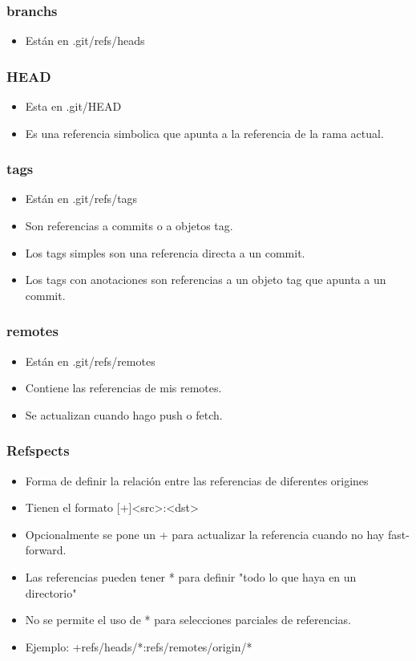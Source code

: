 \documentclass[10pt]{beamer}
\begin{document}
  \begin{frame}
    \frametitle{branchs}
    \begin{itemize}
        \item Están en .git/refs/heads
    \end{itemize}
  \end{frame}

  \begin{frame}
    \frametitle{HEAD}
    \begin{itemize}
        \item Esta en .git/HEAD
        \item Es una referencia simbolica que apunta a la referencia de la rama actual.
    \end{itemize}
  \end{frame}

  \begin{frame}
    \frametitle{tags}
    \begin{itemize}
        \item Están en .git/refs/tags
        \item Son referencias a commits o a objetos tag.
        \item Los tags simples son una referencia directa a un commit.
        \item Los tags con anotaciones son referencias a un objeto tag que apunta a un commit.
    \end{itemize}
  \end{frame}

  \begin{frame}
    \frametitle{remotes}
    \begin{itemize}
        \item Están en .git/refs/remotes
        \item Contiene las referencias de mis remotes.
        \item Se actualizan cuando hago push o fetch.
    \end{itemize}
  \end{frame}

  \begin{frame}
    \frametitle{Refspects}
    \begin{itemize}
        \item Forma de definir la relación entre las referencias de diferentes origines
        \item Tienen el formato [+]<src>:<dst>
        \item Opcionalmente se pone un + para actualizar la referencia cuando no hay fast-forward.
        \item Las referencias pueden tener * para definir "todo lo que haya en un directorio"
        \item No se permite el uso de * para selecciones parciales de referencias.
        \item Ejemplo: +refs/heads/*:refs/remotes/origin/*
    \end{itemize}
  \end{frame}
\end{document}
